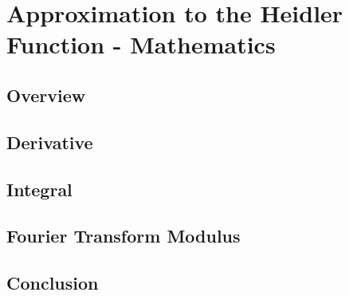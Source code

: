 
\chapter{Approximation to the Heidler Function - Mathematics} %

\label{AppendixLaplace} %



\section{Overview}
\label{sec:app_math_overview}


\section{Derivative}
\label{sec:app_math_derivative}


\section{Integral}
\label{sec:app_math_integral}


\section{Fourier Transform Modulus}
\label{sec:app_math_modulus}



\section{Conclusion}
\label{sec:app_math_conclusion}
